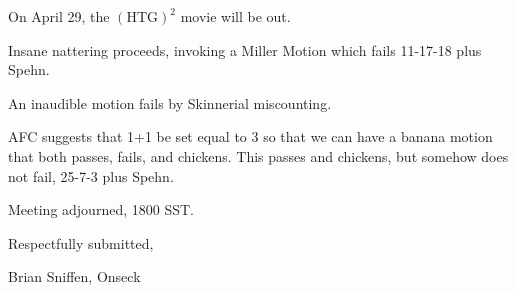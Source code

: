 \documentclass[10pt]{article}
\newcommand{\ps}{ plus Spehn\xspace}
\begin{document}
On April 29, the $(\mathrm{HTG})^2$ movie will be out.

Insane nattering proceeds, invoking a Miller Motion which fails
11-17-18\ps.

An inaudible motion fails by Skinnerial miscounting.

AFC suggests that 1+1 be set equal to 3 so that we can have a banana
motion that both passes, fails, and chickens.  This passes and
chickens, but somehow does not fail, 25-7-3\ps.

\vspace{12pt}

\noindent
Meeting adjourned, 1800 SST.

\vspace{18pt}

\centerline{Respectfully submitted,}
\centerline{Brian Sniffen, Onseck}
\end{document}
